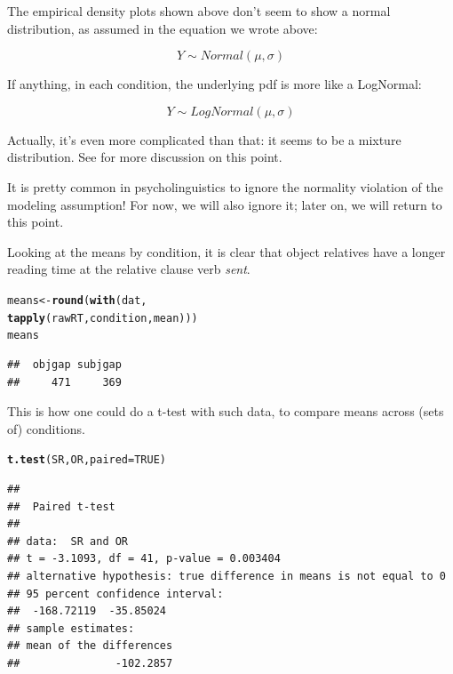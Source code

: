 \documentclass[12pt]{book}\usepackage[]{graphicx}\usepackage[]{color}
\makeatletter
\newcommand{\hlnum}[1]{\textcolor[rgb]{0.686,0.059,0.569}{#1}}%
\newcommand{\hlstd}[1]{\textcolor[rgb]{0.345,0.345,0.345}{#1}}%
\newcommand{\hlkwb}[1]{\textcolor[rgb]{0.69,0.353,0.396}{#1}}%
\newcommand{\hlkwc}[1]{\textcolor[rgb]{0.333,0.667,0.333}{#1}}%
\newcommand{\hlkwd}[1]{\textcolor[rgb]{0.737,0.353,0.396}{\textbf{#1}}}%
\newenvironment{kframe}{%
 \def\at@end@of@kframe{}%
 \ifinner\ifhmode%
  \def\at@end@of@kframe{\end{minipage}}%
  \begin{minipage}{\columnwidth}%
 \fi\fi%
 \def\FrameCommand##1{\hskip\@totalleftmargin \hskip-\fboxsep
 \colorbox{shadecolor}{##1}\hskip-\fboxsep
     \hskip-\linewidth \hskip-\@totalleftmargin \hskip\columnwidth}%
 \MakeFramed {\advance\hsize-\width
   \@totalleftmargin\z@ \linewidth\hsize
   \@setminipage}}%
 {\par\unskip\endMakeFramed%
 \at@end@of@kframe}
\newenvironment{knitrout}{}{} %
\makeatother
\begin{document}
The empirical density plots shown above don't seem to show a normal distribution, as assumed in the equation we wrote above:

\begin{equation}
Y \sim Normal(\mu,\sigma)
\end{equation}

If anything, in each condition, the underlying pdf is more like a LogNormal:

\begin{equation}
Y \sim LogNormal(\mu,\sigma)
\end{equation}

Actually, it's even more complicated than that: it seems to be a mixture distribution. See \cite{VasishthMixture2017} for more discussion on this point. 

It is pretty common in psycholinguistics to ignore the normality violation of the modeling assumption! For now, we will also ignore it; later on, we will return to this point. 

Looking at the means by condition, it is clear that object relatives have a longer reading time at the relative clause verb \textit{sent}.

\begin{knitrout}
\color{fgcolor}\begin{kframe}
\begin{alltt}
\hlstd{means}\hlkwb{<-}\hlkwd{round}\hlstd{(}\hlkwd{with}\hlstd{(dat,}
                  \hlkwd{tapply}\hlstd{(rawRT,condition,mean)))}
\hlstd{means}
\end{alltt}
\begin{verbatim}
##  objgap subjgap 
##     471     369
\end{verbatim}
\end{kframe}
\end{knitrout}

This is how one could do a t-test with such data, to compare means across (sets of) conditions. 

\begin{knitrout}
\color{fgcolor}\begin{kframe}
\begin{alltt}
\hlkwd{t.test}\hlstd{(SR,OR,}\hlkwc{paired}\hlstd{=}\hlnum{TRUE}\hlstd{)}
\end{alltt}
\begin{verbatim}
## 
## 	Paired t-test
## 
## data:  SR and OR
## t = -3.1093, df = 41, p-value = 0.003404
## alternative hypothesis: true difference in means is not equal to 0
## 95 percent confidence interval:
##  -168.72119  -35.85024
## sample estimates:
## mean of the differences 
##               -102.2857
\end{verbatim}
\end{kframe}
\end{knitrout}
\end{document}
